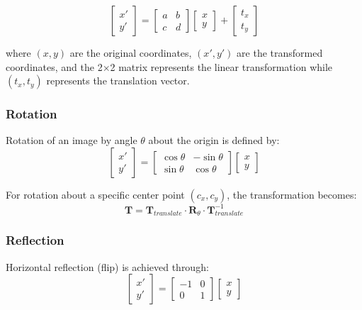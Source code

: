 \documentclass[a4paper, journal]{IEEEtran}
\begin{document}
\begin{equation}
    \begin{bmatrix} x' \\ y' \end{bmatrix} = \begin{bmatrix} a & b \\ c & d \end{bmatrix} \begin{bmatrix} x \\ y \end{bmatrix} + \begin{bmatrix} t_x \\ t_y \end{bmatrix}
\end{equation}

where $(x, y)$ are the original coordinates, $(x', y')$ are the transformed coordinates, and the 2×2 matrix represents the linear transformation while $(t_x, t_y)$ represents the translation vector.

\subsubsection{Rotation}
Rotation of an image by angle $\theta$ about the origin is defined by:
\begin{equation}
    \begin{bmatrix} x' \\ y' \end{bmatrix} = \begin{bmatrix} \cos\theta & -\sin\theta \\ \sin\theta & \cos\theta \end{bmatrix} \begin{bmatrix} x \\ y \end{bmatrix}
\end{equation}

For rotation about a specific center point $(c_x, c_y)$, the transformation becomes:
\begin{equation}
    \mathbf{T} = \mathbf{T}_{translate} \cdot \mathbf{R}_\theta \cdot \mathbf{T}_{translate}^{-1}
\end{equation}

\subsubsection{Reflection}
Horizontal reflection (flip) is achieved through:
\begin{equation}
    \begin{bmatrix} x' \\ y' \end{bmatrix} = \begin{bmatrix} -1 & 0 \\ 0 & 1 \end{bmatrix} \begin{bmatrix} x \\ y \end{bmatrix}
\end{equation}
\end{document}
